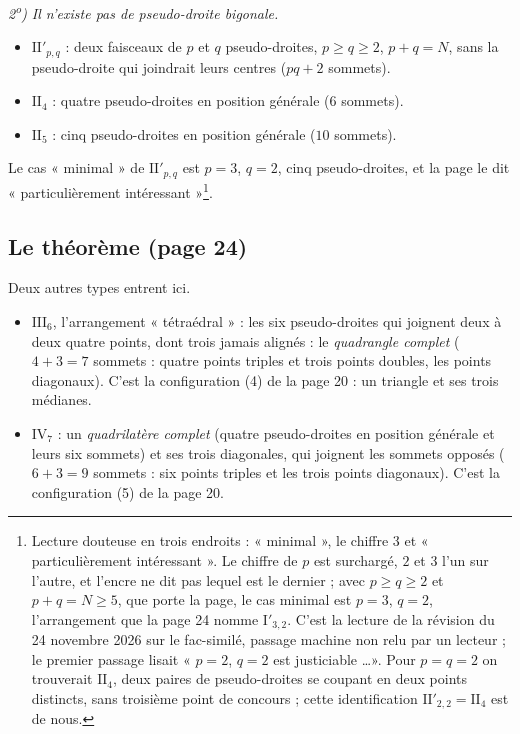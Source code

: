 \documentclass[11pt,a4paper]{article}
\begin{document}
\emph{2\textsuperscript{o}) Il n'existe pas de pseudo-droite bigonale.}
\begin{itemize}
  \item $\mathrm{II}'_{p,q}$ : deux faisceaux de $p$ et $q$ pseudo-droites,
  $p \geqslant q \geqslant 2$, $p + q = N$, sans la pseudo-droite qui joindrait
  leurs centres ($pq + 2$ sommets).
  \item $\mathrm{II}_4$ : quatre pseudo-droites en position générale ($6$
  sommets).
  \item $\mathrm{II}_5$ : cinq pseudo-droites en position générale ($10$
  sommets).
\end{itemize}
Le cas « minimal » de $\mathrm{II}'_{p,q}$ est $p = 3$, $q = 2$, cinq
pseudo-droites, et la page le dit « particulièrement
intéressant »\footnote{Lecture douteuse en trois endroits : « minimal », le
chiffre $3$ et « particulièrement intéressant ». Le chiffre de $p$ est
surchargé, $2$ et $3$ l'un sur l'autre, et l'encre ne dit pas lequel est le
dernier ; avec $p \geqslant q \geqslant 2$ et $p + q = N \geqslant 5$, que porte
la page, le cas minimal est $p = 3$, $q = 2$, l'arrangement que la page 24
nomme $\mathrm{I}'_{3,2}$. C'est la lecture de la révision du 24 novembre 2026 sur le fac-similé,
passage machine non relu par un lecteur ; le premier passage lisait
« $p = 2$, $q = 2$ est justiciable \ldots ». Pour $p = q = 2$ on trouverait
$\mathrm{II}_4$, deux paires de pseudo-droites se coupant en deux points
distincts, sans troisième point de concours ; cette identification
$\mathrm{II}'_{2,2} = \mathrm{II}_4$ est de nous.}.

\subsection*{Le théorème (page 24)}

Deux autres types entrent ici.
\begin{itemize}
  \item $\mathrm{III}_6$, l'arrangement « tétraédral » : les six
  pseudo-droites qui joignent deux à deux quatre points, dont trois jamais
  alignés : le \emph{quadrangle complet} ($4 + 3 = 7$ sommets : quatre
  points triples et trois points doubles, les points diagonaux). C'est la
  configuration (4) de la page 20 : un triangle et ses trois médianes.
  \item $\mathrm{IV}_7$ : un \emph{quadrilatère complet} (quatre
  pseudo-droites en position générale et leurs six sommets) et ses trois
  diagonales, qui joignent les sommets opposés ($6 + 3 = 9$ sommets : six
  points triples et les trois points diagonaux). C'est la configuration (5)
  de la page 20.
\end{itemize}
\end{document}
